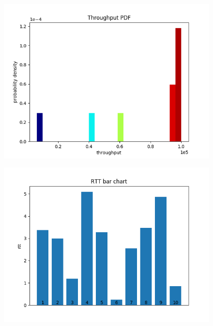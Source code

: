 \documentclass{article}
\begin{document}
\begin{figure}[h] \label{usrp-fails2-2}
	\includegraphics[width=\textwidth]{usrp_fail2_tp_pdf}	
\end{figure} 

\begin{figure}[h] \label{usrp-fails2-3}
	\includegraphics[width=\textwidth]{usrp_fail2_rtt_bar}
	
\end{figure} 
\end{document}
